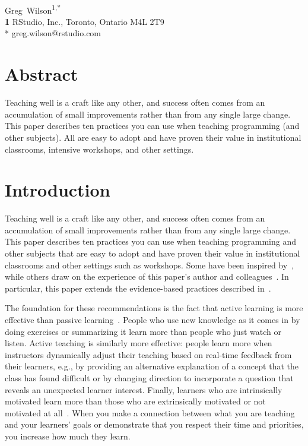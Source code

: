 \documentclass[10pt,letterpaper]{article}
\begin{document}
\vspace*{0.2in}

\begin{flushleft}
{\Large
\textbf{}
}
\newline
\\
{Greg~Wilson}\textsuperscript{1,*}
\\
\textbf{1} RStudio, Inc., Toronto, Ontario M4L 2T9
\\
\bigskip
* greg.wilson@rstudio.com
\end{flushleft}

\section*{Abstract}

Teaching well is a craft like any other,
and success often comes from an accumulation of small improvements
rather than from any single large change.
This paper describes ten practices you can use when teaching programming (and other subjects).
All are easy to adopt
and have proven their value in institutional classrooms,
intensive workshops,
and other settings.

\section*{Introduction}

Teaching well is a craft like any other,
and success often comes from an accumulation of small improvements
rather than from any single large change.
This paper describes ten practices you can use when teaching programming and other subjects
that are easy to adopt
and have proven their value in institutional classrooms and other settings such as workshops.
Some have been inspired by~\cite{Hust2012,Lang2016,Lemo2014},
while others draw on the experience of this paper's author and colleagues~\cite{Wils2016,Deve2018,Wils2019}.
In particular,
this paper extends the evidence-based practices described in~\cite{Brow2018}.

The foundation for these recommendations is the fact that
active learning is more effective than passive learning~\cite{Ambr2010,HPL2}.
People who use new knowledge as it comes in by doing exercises or summarizing it
learn more than people who just watch or listen.
Active teaching is similarly more effective:
people learn more when instructors dynamically adjust their teaching
based on real-time feedback from their learners,
e.g.,
by providing an alternative explanation of a concept that the class has found difficult
or by changing direction to incorporate a question that reveals an unexpected learner interest.
Finally,
learners who are intrinsically motivated learn more than those who are extrinsically motivated
or not motivated at all~\cite{Wlod2017}.
When you make a connection between what you are teaching and your learners' goals
or demonstrate that you respect their time and priorities,
you increase how much they learn.
\end{document}
